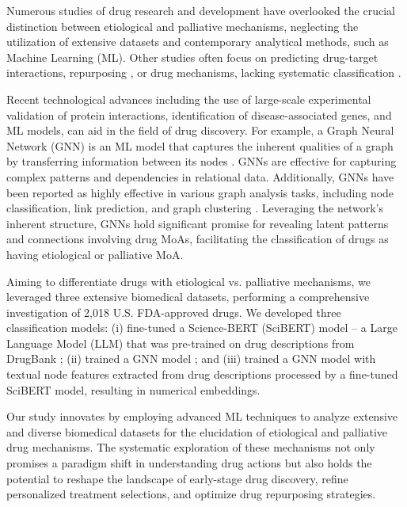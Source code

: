 \documentclass[journal,twoside,web]{ieeecolor}
\begin{document}
Numerous studies \cite{thafar2020dtigems+, sachdev2019comprehensive,vogt2014molecularly} of drug research and development have overlooked the crucial distinction between etiological and palliative mechanisms, neglecting the utilization of extensive datasets and contemporary analytical methods, such as Machine Learning (ML).
Other studies often focus on predicting drug-target interactions, repurposing \cite{fahimian2020repcool}, or drug mechanisms, lacking systematic classification \cite{vogt2014molecularly}.

Recent technological advances including the use of large-scale experimental validation of protein interactions, identification of disease-associated genes, and ML models, can aid in the field of drug discovery.
For example, a Graph Neural Network (GNN) is an ML model that captures the inherent qualities of a graph by transferring information between its nodes \cite{zhou2020graph}.
GNNs are effective for capturing complex patterns and dependencies in relational data.
Additionally, GNNs have been reported as highly effective in various graph analysis tasks, including node classification, link prediction, and graph clustering \cite{bongini2021molecular,jiang2021could,zhou2020graph}.
Leveraging the network's inherent structure, GNNs hold significant promise for revealing latent patterns and connections involving drug MoAs, facilitating the classification of drugs as having etiological or palliative MoA.

Aiming to differentiate drugs with etiological vs. palliative mechanisms, we leveraged three extensive biomedical datasets, performing a comprehensive investigation of 2,018 U.S. FDA-approved drugs.
We developed three classification models:
(i) fine-tuned a Science-BERT (SciBERT) model -- a Large Language Model (LLM) that was pre-trained \cite{beltagy2019scibert} on drug descriptions from DrugBank \cite{wishart2018drugbank,knox2024drugbank};
(ii) trained a GNN model \cite{huang2020combining}; and
(iii) trained a GNN model with textual node features extracted from drug descriptions processed by a fine-tuned SciBERT model, resulting in numerical embeddings.

Our study innovates by employing advanced ML techniques to analyze extensive and diverse biomedical datasets for the elucidation of etiological and palliative drug mechanisms.
The systematic exploration of these mechanisms not only promises a paradigm shift in understanding drug actions but also holds the potential to reshape the landscape of early-stage drug discovery, refine personalized treatment selections, and optimize drug repurposing strategies.
\end{document}
